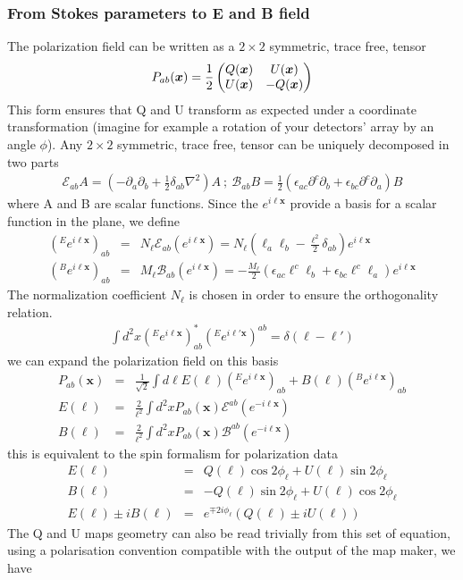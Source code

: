 \documentclass[a4paper, 11pt]{article}
\def\eop{\mathcal{E}}
\def\bop{\mathcal{B}}
\def\ba{\begin{eqnarray}}
\def\ea{\end{eqnarray}}
\begin{document}
\subsubsection{From Stokes parameters to E and B field}

The polarization field can be written as  a $2\times2$ symmetric, trace free, tensor 
\ba
P_{ab}(\bm{x})= \frac{1}{2}
\begin{pmatrix} 
Q(\bm{x}) & 
U(\bm{x}) \cr
U(\bm{x}) & 
-Q(\bm{x}) \cr
\end{pmatrix} 
\ea
This form ensures that Q and U transform as expected under a coordinate transformation (imagine for example a rotation of your detectors' array by an angle $\phi$).
Any $2\times2$ symmetric, trace free, tensor can be uniquely decomposed in two parts
\ba 
\eop_{ab} A=(-\partial_{a}\partial_{b}+ \frac{1}{2}\delta_{ab} \nabla^{2})A \ ; \ \bop_{ab}B=\frac{1}{2} (\epsilon_{ac}\partial^{c}\partial_{b} + \epsilon_{bc}\partial^{c}\partial_{a})B
\ea
where A and B are scalar functions. Since the $e^{i\bm{\ell} \bm{x}}$ provide a basis for a scalar function in the plane, we define
\ba
(^{E}e^{i\bm{\ell}\bm{x}})_{ab} &=& N_{\bm{\ell}} \eop_{ab} (e^{i\bm{\ell}\bm{x}})= N_{\bm{\ell}} ( \ell_{a}\ell_{b}- \frac{\bm{\ell}^{2}}{2}\delta_{ab})e^{i\bm{\ell}\bm{x}} \\
(^{B}e^{i\bm{\ell}\bm{x}})_{ab} &=& M_{\bm{\ell}}\bop_{ab} (e^{i\bm{\ell}\bm{x}})=- \frac{M_{\bm{\ell}}}{2} (\epsilon_{ac}\ell^{c}\ell_{b} + \epsilon_{bc}\ell^{c}\ell_{a}) e^{i\bm{\ell}\bm{x}}
\ea
The normalization coefficient $N_{\bm{\ell}}$ is chosen in order to ensure the orthogonality relation.
\ba
\int d^{2}x (^{E}e^{i\bm{\ell}\bm{x}})^{*}_{ab} (^{E}e^{i\bm{\ell}'\bm{x}})^ {ab} = \delta( \bm{\ell}-\bm{\ell}')
\ea
we can expand the polarization field on this basis
\ba
P_{ab}(\bm{x}) &=& \frac{1}{\sqrt{2}} \int d\bm{\ell} E(\bm{\ell}) (^{E}e^{i\bm{\ell}\bm{x}})_{ab} +B({\bm{\ell}}) (^{B}e^{i\bm{\ell}\bm{x}})_{ab} \\
 E({\bm{\ell}}) &=& \frac{2}{\ell^{2}} \int d^{2}x   P_{ab}(\bm{x})   \eop^{ab}(e^{-i\bm{\ell}\bm{x}}) \\
 B({\bm{\ell}}) &=& \frac{2}{\ell^{2}} \int d^{2}x   P_{ab}(\bm{x})  \bop^{ab}(e^{-i\bm{\ell}\bm{x}}) 
\ea
this is equivalent to the spin formalism for polarization data
\ba
E({\bm{\ell}}) &=& Q(\bm{\ell}) \cos 2\phi_{\bm{\ell}}+U(\bm{\ell})\sin 2\phi_{\bm{\ell}}   \\
B({\bm{\ell}}) &=& -Q(\bm{\ell})\sin 2\phi_{\bm{\ell}} +U(\bm{\ell}) \cos 2\phi_{\bm{\ell}}  \\
E({\bm{\ell}}) \pm i B({\bm{\ell}})&=& e^{\mp 2i\phi_{\bm{\ell}}}(Q(\bm{\ell}) \pm i U(\bm{\ell}))
\ea
The Q and U maps geometry can also be read trivially from this set of equation, using a polarisation convention compatible with the output of the map maker, we have
\end{document}
